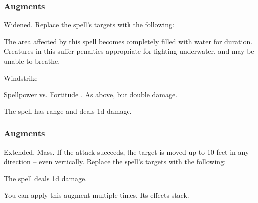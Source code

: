 \subsubsection{Augments}
 Widened.
Replace
the spell's targets with the following:
\begin{augmenttargetinginfo}
\end{augmenttargetinginfo}
The area affected by this spell becomes completely filled with water for \durbrief duration.
Creatures in this  suffer penalties appropriate for fighting underwater, and may be unable to breathe.
\begin{spellsection}{Windstrike}
\begin{spellheader}
\end{spellheader}
\begin{spellcontent}
\begin{spelltargetinginfo}
\end{spelltargetinginfo}
\begin{spelleffects}
\begin{spellattack}{Spellpower vs. Fortitude}
\spellsuccess {}.
\spellcritical As above, but double damage.
\end{spellattack}
\end{spelleffects}
\end{spellcontent}
\begin{spellfooter}
\miscastexplode
\end{spellfooter}
\begin{spellcantrip}
The spell has \rngclose range and deals \minus1d damage.
\end{spellcantrip}
\end{spellsection}
\subsubsection{Augments}
 Extended, Mass.
If the attack succeeds, the target is moved up to 10 feet in any direction -- even vertically.
Replace
the spell's targets with the following:
\begin{augmenttargetinginfo}
\end{augmenttargetinginfo}
The spell deals \plus1d damage.
\par
You can apply this augment multiple times.
Its effects stack.
